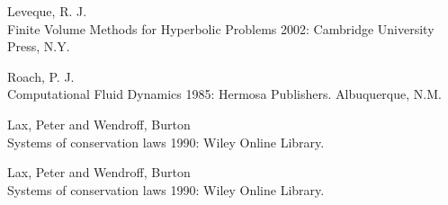 




\begin{thebibliography}{1}

  Leveque, R. J. {\\Finite Volume Methods for Hyperbolic Problems} 2002:
Cambridge University Press, N.Y.

 Roach, P. J. {\\Computational Fluid Dynamics} 1985: Hermosa Publishers. Albuquerque, N.M.

 Lax, Peter and Wendroff, Burton {\\Systems of conservation laws} 1990: Wiley Online Library.

 Lax, Peter and Wendroff, Burton {\\Systems of conservation laws} 1990: Wiley Online Library.


\end{thebibliography}